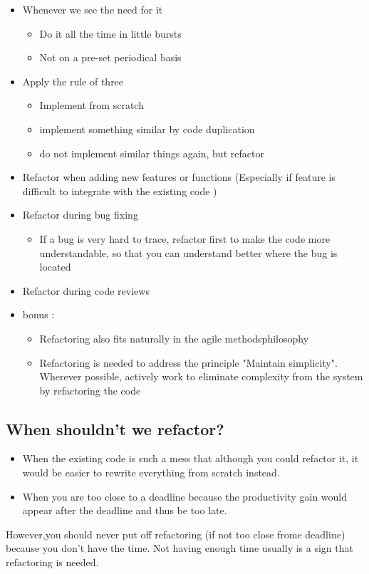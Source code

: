 \begin{itemize}
\item Whenever we see the need for it
\begin{itemize}
\item Do it all the time in little bursts
\item Not on a pre-set periodical basis
\end{itemize}
\item Apply the rule of three
\begin{itemize}
\item Implement from scratch
\item implement something similar by code duplication
\item do not implement similar things again, but refactor
\end{itemize}
\item Refactor when adding new features or functions (Especially if  feature is difficult to integrate with the existing 
code )
\item Refactor during bug fixing 
\begin{itemize}
\item If  a bug is very hard to trace, refactor first to make the code more understandable, so that you can understand better 
where the bug is located
\end{itemize}
\item Refactor during code reviews
\item bonus :\\
\begin{itemize}
\item Refactoring also fits naturally in the agile methodsphilosophy 
\item Refactoring is needed to address the principle "Maintain 
simplicity". Wherever possible, actively work to eliminate complexity from the system by refactoring the code
\end{itemize}
\end{itemize}

\subsection{When shouldn't we refactor?}
\begin{itemize}
\item When the existing code is such a mess that although you could refactor it, it would be easier to rewrite everything from scratch instead. 
\item When you are too close to a deadline because the productivity gain would appear after the deadline and thus be too late. 
\end{itemize}
However,you should never put off refactoring (if not too close frome deadline) because you don’t have the time. Not having enough time usually is a sign that refactoring is needed.
